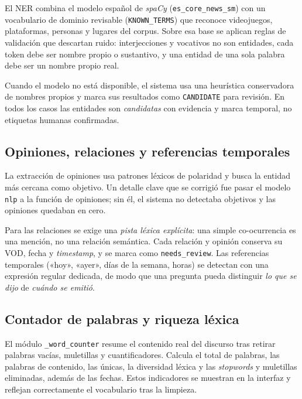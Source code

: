 \documentclass[12pt,a4paper]{article}
\begin{document}
El NER combina el modelo español de \emph{spaCy} (\texttt{es\_core\_news\_sm}) con un vocabulario de dominio revisable (\texttt{KNOWN\_TERMS}) que reconoce videojuegos, plataformas, personas y lugares del corpus. Sobre esa base se aplican reglas de validación que descartan ruido: interjecciones y vocativos no son entidades, cada token debe ser nombre propio o sustantivo, y una entidad de una sola palabra debe ser un nombre propio real.


Cuando el modelo no está disponible, el sistema usa una heurística conservadora de nombres propios y marca sus resultados como \texttt{CANDIDATE} para revisión. En todos los casos las entidades son \emph{candidatas} con evidencia y marca temporal, no etiquetas humanas confirmadas.

\subsection{Opiniones, relaciones y referencias temporales}

La extracción de opiniones usa patrones léxicos de polaridad y busca la entidad más cercana como objetivo. Un detalle clave que se corrigió fue pasar el modelo \texttt{nlp} a la función de opiniones; sin él, el sistema no detectaba objetivos y las opiniones quedaban en cero.


Para las relaciones se exige una \emph{pista léxica explícita}: una simple co-ocurrencia es una mención, no una relación semántica. Cada relación y opinión conserva su VOD, fecha y \emph{timestamp}, y se marca como \texttt{needs\_review}. Las referencias temporales («hoy», «ayer», días de la semana, horas) se detectan con una expresión regular dedicada, de modo que una pregunta pueda distinguir \emph{lo que se dijo} de \emph{cuándo se emitió}.

\subsection{Contador de palabras y riqueza léxica}

El módulo \texttt{\_word\_counter} resume el contenido real del discurso tras retirar palabras vacías, muletillas y cuantificadores. Calcula el total de palabras, las palabras de contenido, las únicas, la diversidad léxica y las \emph{stopwords} y muletillas eliminadas, además de las fechas. Estos indicadores se muestran en la interfaz y reflejan correctamente el vocabulario tras la limpieza.

\end{document}
